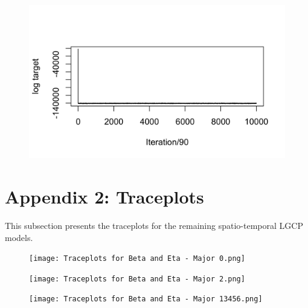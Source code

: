 \documentclass[12pt,a4paper]{report}
\begin{document}
\begin{figure}[H]
\begin{center}
\includegraphics{Log Target Plot - ST - Major 13456.png}
\end{center}
\end{figure}

\newpage

\section*{Appendix 2: Traceplots}

This subsection presents the traceplots for the remaining spatio-temporal LGCP models. 

\begin{figure}[H]
\begin{center}
\texttt{[image: Traceplots for Beta and Eta - Major 0.png]}
\end{center}
\end{figure}

\begin{figure}[h]
\begin{center}
\texttt{[image: Traceplots for Beta and Eta - Major 2.png]}
\end{center}
\end{figure}

\begin{figure}[H]
\begin{center}
\texttt{[image: Traceplots for Beta and Eta - Major 13456.png]}
\end{center}
\end{figure}
\end{document}
